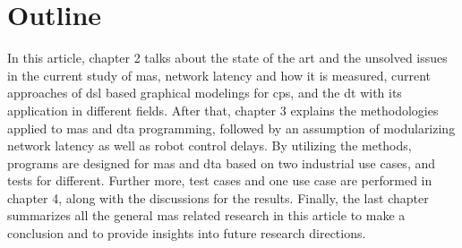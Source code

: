 \section{Outline}
In this article, chapter 2 talks about the state of the art and 
the unsolved issues in the current study of \gls{mas}, network 
latency and how it is measured, current approaches of \gls{dsl} 
based graphical modelings for \gls{cps}, and the \gls{dt} with 
its application in different fields. After that, chapter 3 explains 
the methodologies applied to \gls{mas} and \gls{dta} programming, 
followed by an assumption of modularizing network latency as well 
as robot control delays. By utilizing the methods, programs are 
designed for \gls{mas} and \gls{dta} based on two industrial use cases, 
and tests for different. Further more, test cases and one use case are 
performed in chapter 4, along with 
the discussions for the results. Finally, the last chapter summarizes 
all the general \gls{mas} related research in this article to make a 
conclusion and to provide insights into future research directions.  